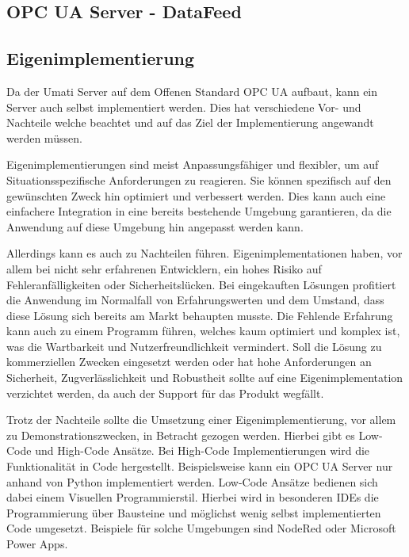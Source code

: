 \documentclass[a4paper, 12pt, oneside]{scrbook}
\begin{document}
		\subsection{OPC UA Server - DataFeed}
		
		
		
		
		\subsection{Eigenimplementierung}
		
		Da der Umati Server auf dem Offenen Standard OPC UA aufbaut, kann ein Server auch selbst implementiert werden. Dies hat verschiedene Vor- und Nachteile welche beachtet und auf das Ziel der Implementierung angewandt werden müssen. 
		
		Eigenimplementierungen sind meist Anpassungsfähiger und flexibler, um auf Situationsspezifische Anforderungen zu reagieren. Sie können spezifisch auf den gewünschten Zweck hin optimiert und verbessert werden. Dies kann auch eine einfachere Integration in eine bereits bestehende Umgebung garantieren, da die Anwendung auf diese Umgebung hin angepasst werden kann.
		
		Allerdings kann es auch zu Nachteilen führen. Eigenimplementationen haben, vor allem bei nicht sehr erfahrenen Entwicklern, ein hohes Risiko auf Fehleranfälligkeiten oder Sicherheitslücken. Bei eingekauften Lösungen profitiert die Anwendung im Normalfall von Erfahrungswerten und dem Umstand, dass diese Lösung sich bereits am Markt behaupten musste. Die Fehlende Erfahrung kann auch zu einem Programm führen, welches kaum optimiert und komplex ist, was die Wartbarkeit und Nutzerfreundlichkeit vermindert. Soll die Lösung zu kommerziellen Zwecken eingesetzt werden oder hat hohe Anforderungen an Sicherheit, Zugverlässlichkeit und Robustheit sollte auf eine Eigenimplementation verzichtet werden, da auch der Support für das Produkt wegfällt.
		
		Trotz der Nachteile sollte die Umsetzung einer Eigenimplementierung, vor allem zu Demonstrationszwecken, in Betracht gezogen werden. Hierbei gibt es Low-Code und High-Code Ansätze. Bei High-Code Implementierungen wird die Funktionalität in Code hergestellt. Beispielsweise kann ein OPC UA Server nur anhand von Python implementiert werden. Low-Code Ansätze bedienen sich dabei einem Visuellen Programmierstil. Hierbei wird in besonderen IDEs die Programmierung über Bausteine und möglichst wenig selbst implementierten Code umgesetzt. Beispiele für solche Umgebungen sind NodeRed oder Microsoft Power Apps. 
		
\end{document}
